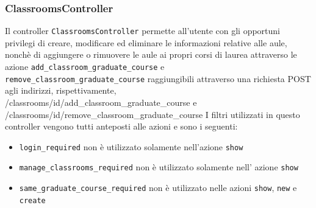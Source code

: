 \documentclass[11pt,a4paper]{article}
\begin{document}
\subsubsection{ClassroomsController}
Il controller \verb|ClassroomsController| permette all'utente con gli opportuni privilegi di creare, modificare ed eliminare le informazioni relative alle aule, nonchè di aggiungere o rimuovere le aule ai propri corsi di laurea attraverso le azione \verb|add_classroom_graduate_course| e \\ \verb|remove_classroom_graduate_course| raggiungibili attraverso una richiesta POST agli indirizzi, rispettivamente,\\ /classrooms/id/add\_classroom\_graduate\_course e \\ /classrooms/id/remove\_classroom\_graduate\_course
I filtri utilizzati in questo controller vengono tutti anteposti alle azioni e sono i seguenti:
\begin{itemize}
 \item \verb|login_required| non è utilizzato solamente nell'azione \verb|show|
 \item \verb|manage_classrooms_required| non è utilizzato solamente nell' azione \verb|show|
 \item \verb|same_graduate_course_required| non è utilizzato nelle azioni \verb|show|, \verb|new| e \verb|create|
\end{itemize}
\end{document}
